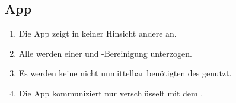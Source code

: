 \subsection{App}

\begin{enumerate}
    \item Die App zeigt in keiner Hinsicht andere %
        an.
    \item Alle %
        werden einer %
        und %
        -Bereinigung unterzogen.
    \item Es werden keine nicht unmittelbar benötigten %
        des %
            genutzt.
    \item Die App kommuniziert nur verschlüsselt mit dem %
        .
\end{enumerate}